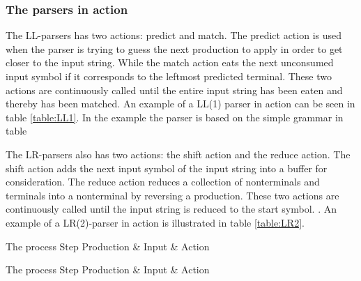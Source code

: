 \subsubsection{The parsers in action} 
The LL-parsers has two actions: predict and match. The predict action is used when the parser is trying to guess the next production to apply in order to get closer to the input string. While the match action eats the next unconsumed input symbol if it corresponds to the leftmost predicted terminal. These two actions are continuously called until the entire input string has been eaten and thereby has been matched. An example of a LL(1) parser in action can be seen in table \ref{table:LL1}. In the example the parser is based on the simple grammar in table 

\begin{centering}
\begin{ebnf}
\end{ebnf}
\end{centering}
The LR-parsers also has two actions: the shift action and the reduce action. The shift action adds the next input symbol of the input string into a buffer for consideration. The reduce action reduces a collection of nonterminals and terminals into a nonterminal by reversing a production. These two actions are
continuously called until the input string is reduced to the start symbol. \cite{LL(1)andLR(2)inaction}. An example of a LR(2)-parser in action is illustrated in table \ref{table:LR2}.

	      {The process                                              }
{Step  	 }{Production & Input       & Action                        }{
}

	      {The process}
{Step  	 }{Production & Input       & Action                     }{
}


